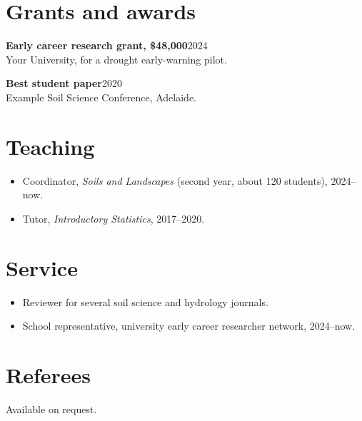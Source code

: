 \documentclass[10pt,a4paper]{article}   %
\newcommand{\entry}[3]{\textbf{#1}\hfill #2\\#3\par}
\begin{document}
\section{Grants and awards}
\entry{Early career research grant, \$48,000}{2024}{Your University, for a drought early-warning pilot.}
\entry{Best student paper}{2020}{Example Soil Science Conference, Adelaide.}

\section{Teaching}
\begin{itemize}
  \item Coordinator, \emph{Soils and Landscapes} (second year, about 120 students), 2024--now.
  \item Tutor, \emph{Introductory Statistics}, 2017--2020.
\end{itemize}

\section{Service}
\begin{itemize}
  \item Reviewer for several soil science and hydrology journals.
  \item School representative, university early career researcher network, 2024--now.
\end{itemize}

\section{Referees}
Available on request.

\printbibliography
\end{document}
